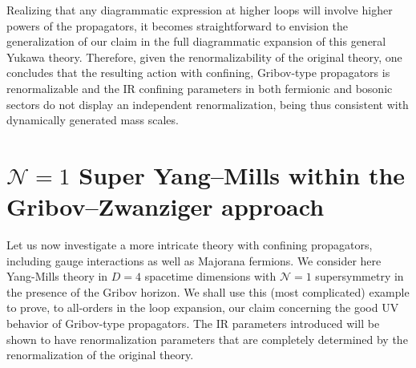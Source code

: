 Realizing that any diagrammatic expression at higher loops will involve higher powers of the
propagators, it becomes straightforward to envision the generalization of our claim in the full
diagrammatic expansion of this general Yukawa theory. Therefore, given the renormalizability of
the original theory, one concludes that the resulting action with confining, Gribov-type
propagators is renormalizable and the IR confining parameters in both fermionic and bosonic
sectors do not display an independent renormalization, being thus consistent with dynamically
generated mass scales.















\section{$\mathcal N=1$ Super Yang--Mills within the Gribov--Zwanziger approach}
\label{symN1}

Let us now investigate a more intricate theory with confining propagators, including gauge interactions as well as Majorana fermions. We consider here Yang-Mills theory in $D=4$ spacetime dimensions with $\mathcal N=1$ supersymmetry in the presence of the Gribov horizon. We shall use this (most complicated) example to prove, to all-orders in the loop expansion, our claim concerning the good UV behavior of Gribov-type propagators. The IR parameters introduced will be shown to have renormalization parameters that are completely determined by the renormalization of the original theory.

